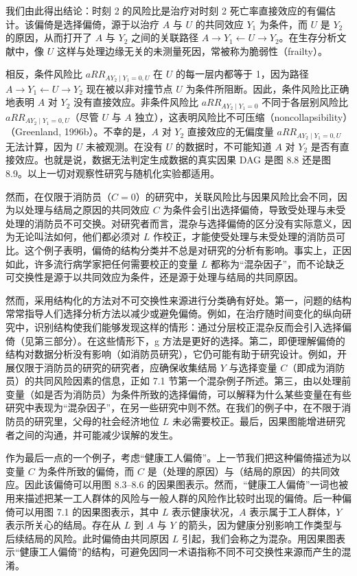 \begin{techpoint}[风险比固有的选择偏倚]
我们由此得出结论：时刻 2 的风险比是治疗对时刻 2 死亡率直接效应的有偏估计。该偏倚是选择偏倚，源于以治疗 $A$ 与 $U$ 的共同效应 $Y_1$ 为条件，而 $U$ 是 $Y_2$ 的原因，从而打开了 $A$ 与 $Y_2$ 之间的关联路径 $A\to Y_1\leftarrow U\to Y_2$。在生存分析文献中，像 $U$ 这样与处理边缘无关的未测量死因，常被称为脆弱性（frailty）。

相反，条件风险比 $aRR_{AY_2\mid Y_1=0,U}$ 在 $U$ 的每一层内都等于 1，因为路径 $A\to Y_1\leftarrow U\to Y_2$ 现在被以非对撞节点 $U$ 为条件所阻断。因此，条件风险比正确地表明 $A$ 对 $Y_2$ 没有直接效应。非条件风险比 $aRR_{AY_2\mid Y_1=0}$ 不同于各层别风险比 $aRR_{AY_2\mid Y_1=0,U}$（尽管 $U$ 与 $A$ 独立），这表明风险比不可压缩（noncollapsibility）（Greenland, 1996b）。不幸的是，$A$ 对 $Y_2$ 直接效应的无偏度量 $aRR_{AY_2\mid Y_1=0,U}$ 无法计算，因为 $U$ 未被观测。在没有 $U$ 的数据时，不可能知道 $A$ 对 $Y_2$ 是否有直接效应。也就是说，数据无法判定生成数据的真实因果 DAG 是图 8.8 还是图 8.9。以上一切对观察性研究与随机化实验都适用。
\end{techpoint}

然而，在仅限于消防员（$C=0$）的研究中，关联风险比与因果风险比会不同，因为以处理与结局之原因的共同效应 $C$ 为条件会引出选择偏倚，导致受处理与未受处理的消防员不可交换。对研究者而言，混杂与选择偏倚的区分没有实际意义，因为无论叫法如何，他们都必须对 $L$ 作校正，才能使受处理与未受处理的消防员可比。这个例子表明，偏倚的结构分类并不总是对研究的分析有影响。事实上，正因如此，许多流行病学家把任何需要校正的变量 $L$ 都称为“混杂因子”，而不论缺乏可交换性是源于以共同效应为条件，还是源于处理与结局的共同原因。

然而，采用结构化的方法对不可交换性来源进行分类确有好处。第一，问题的结构常常指导人们选择分析方法以减少或避免偏倚。例如，在治疗随时间变化的纵向研究中，识别结构使我们能够发现这样的情形：通过分层校正混杂反而会引入选择偏倚（见第三部分）。在这些情形下，g 方法是更好的选择。第二，即便理解偏倚的结构对数据分析没有影响（如消防员研究），它仍可能有助于研究设计。例如，开展仅限于消防员的研究的研究者，应确保收集结局 $Y$ 与选择变量 $C$（即成为消防员）的共同风险因素的信息，正如 7.1 节第一个混杂例子所述。第三，由以处理前变量（如是否为消防员）为条件所致的选择偏倚，可以解释为什么某些变量在有些研究中表现为“混杂因子”，在另一些研究中则不然。在我们的例子中，在不限于消防员的研究里，父母的社会经济地位 $L$ 未必需要校正。最后，因果图能增进研究者之间的沟通，并可能减少误解的发生。

作为最后一点的一个例子，考虑“健康工人偏倚”。上一节我们把这种偏倚描述为以变量 $C$ 为条件所致的偏倚，而 $C$ 是（处理的原因）与（结局的原因）的共同效应。因此该偏倚可以用图 8.3–8.6 的因果图表示。然而，“健康工人偏倚”一词也被用来描述把某一工人群体的风险与一般人群的风险作比较时出现的偏倚。后一种偏倚可以用图 7.1 的因果图表示，其中 $L$ 表示健康状况，$A$ 表示属于工人群体，$Y$ 表示所关心的结局。存在从 $L$ 到 $A$ 与 $Y$ 的箭头，因为健康分别影响工作类型与后续结局的风险。此时偏倚由共同原因 $L$ 引起，我们会称之为混杂。用因果图表示“健康工人偏倚”的结构，可避免因同一术语指称不同不可交换性来源而产生的混淆。

